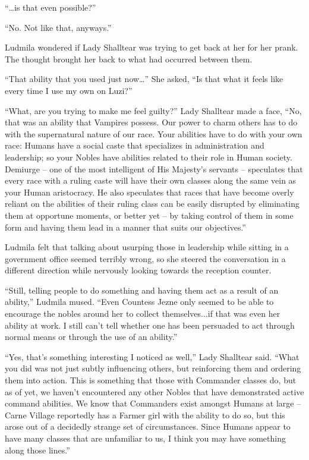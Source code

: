  

“…is that even possible?”

 

“No. Not like that, anyways.”

 

Ludmila wondered if Lady Shalltear was trying to get back at her for her prank. The thought brought her back to what had occurred between them.

 

“That ability that you used just now…” She asked, “Is that what it feels like every time I use my own on Luzi?”

 

“What, are you trying to make me feel guilty?” Lady Shalltear made a face, “No, that was an ability that Vampires possess. Our power to charm others has to do with the supernatural nature of our race. Your abilities have to do with your own race: Humans have a social caste that specializes in administration and leadership; so your Nobles have abilities related to their role in Human society. Demiurge – one of the most intelligent of His Majesty’s servants – speculates that every race with a ruling caste will have their own classes along the same vein as your Human aristocracy. He also speculates that races that have become overly reliant on the abilities of their ruling class can be easily disrupted by eliminating them at opportune moments, or better yet – by taking control of them in some form and having them lead in a manner that suits our objectives.”

 

Ludmila felt that talking about usurping those in leadership while sitting in a government office seemed terribly wrong, so she steered the conversation in a different direction while nervously looking towards the reception counter.

 

“Still, telling people to do something and having them act as a result of an ability,” Ludmila mused. “Even Countess Jezne only seemed to be able to encourage the nobles around her to collect themselves...if that was even her ability at work. I still can’t tell whether one has been persuaded to act through normal means or through the use of an ability.”

 

“Yes, that’s something interesting I noticed as well,” Lady Shalltear said. “What you did was not just subtly influencing others, but reinforcing them and ordering them into action. This is something that those with Commander classes do, but as of yet, we haven’t encountered any other Nobles that have demonstrated active command abilities. We know that Commanders exist amongst Humans at large – Carne Village reportedly has a Farmer girl with the ability to do so, but this arose out of a decidedly strange set of circumstances. Since Humans appear to have many classes that are unfamiliar to us, I think you may have something along those lines.”

